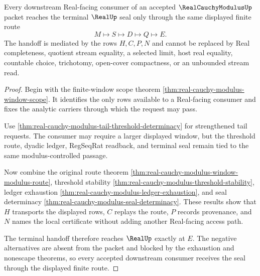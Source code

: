 \begin{theorem}
\label{thm:real-cauchy-modulus-seal-handoff}
Every downstream Real-facing consumer of an accepted $\RealCauchyModulusUp$ packet reaches the terminal $\RealUp$ seal only through the same displayed finite route
$$
M\longmapsto S\longmapsto D\longmapsto Q\longmapsto E.
$$
The handoff is mediated by the rows $H,C,P,N$ and cannot be replaced by Real completeness, quotient stream equality, a selected limit, host real equality, countable choice, trichotomy, open-cover compactness, or an unbounded stream read.
\end{theorem}
\begin{proof}
Begin with the finite-window scope theorem \autoref{thm:real-cauchy-modulus-window-scope}. It identifies the only rows available to a Real-facing consumer and fixes the analytic carriers through which the request may pass.

Use \autoref{thm:real-cauchy-modulus-tail-threshold-determinacy} for strengthened tail requests. The consumer may require a larger displayed window, but the threshold route, dyadic ledger, RegSeqRat readback, and terminal seal remain tied to the same modulus-controlled passage.

Now combine the original route theorem \autoref{thm:real-cauchy-modulus-window-modulus-route}, threshold stability \autoref{thm:real-cauchy-modulus-threshold-stability}, ledger exhaustion \autoref{thm:real-cauchy-modulus-ledger-exhaustion}, and seal determinacy \autoref{thm:real-cauchy-modulus-seal-determinacy}. These results show that $H$ transports the displayed rows, $C$ replays the route, $P$ records provenance, and $N$ names the local certificate without adding another Real-facing access path.

The terminal handoff therefore reaches $\RealUp$ exactly at $E$. The negative alternatives are absent from the packet and blocked by the exhaustion and nonescape theorems, so every accepted downstream consumer receives the seal through the displayed finite route.
\end{proof}

